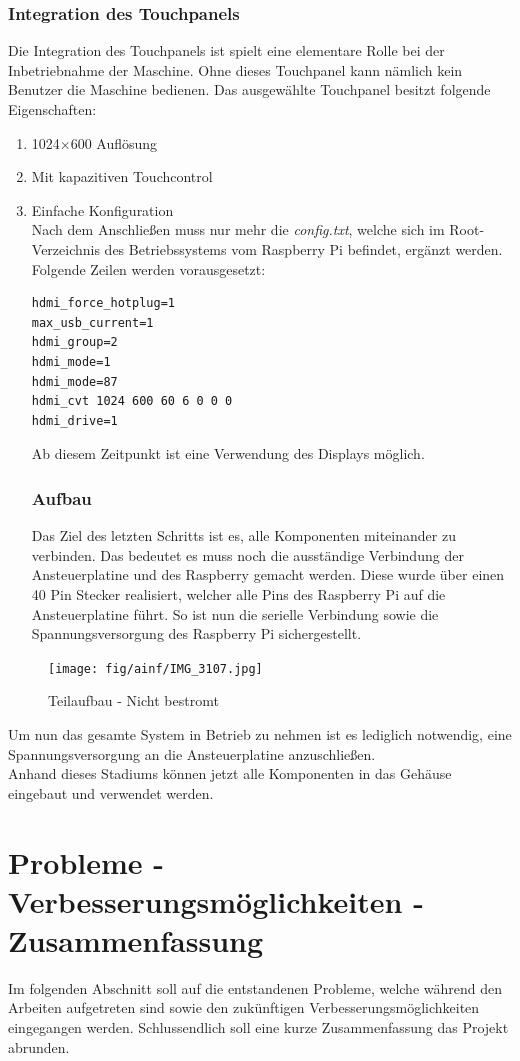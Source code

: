 \subsubsection{Integration des Touchpanels}
Die Integration des Touchpanels ist spielt eine elementare Rolle bei der Inbetriebnahme der Maschine.
Ohne dieses Touchpanel kann nämlich kein Benutzer die Maschine bedienen.
Das ausgewählte Touchpanel besitzt folgende Eigenschaften:
\begin{enumerate}
\item  1024×600 Auflösung
\item Mit kapazitiven Touchcontrol
\item Einfache Konfiguration\\
Nach dem Anschließen muss nur mehr die \textit{config.txt}, welche sich im Root-Verzeichnis des Betriebssystems vom Raspberry Pi befindet, ergänzt werden.
Folgende Zeilen werden vorausgesetzt:
\begin{lstlisting}[style=java,caption=Display-Parameter,label=resource]
hdmi_force_hotplug=1
max_usb_current=1
hdmi_group=2
hdmi_mode=1
hdmi_mode=87
hdmi_cvt 1024 600 60 6 0 0 0
hdmi_drive=1
\end{lstlisting}
Ab diesem Zeitpunkt ist eine Verwendung des Displays möglich.
\subsubsection{Aufbau}
Das Ziel des letzten Schritts ist es, alle Komponenten miteinander zu verbinden.
Das bedeutet es muss noch die ausständige Verbindung der Ansteuerplatine und des Raspberry gemacht werden.
Diese wurde über einen 40 Pin Stecker realisiert, welcher alle Pins des Raspberry Pi auf die Ansteuerplatine führt.
So ist nun die serielle Verbindung sowie die Spannungsversorgung des Raspberry Pi sichergestellt.
\end{enumerate}
\begin{figure}[H]
\centering
\texttt{[image: fig/ainf/IMG\_3107.jpg]}
\caption{Teilaufbau - Nicht bestromt}
\label{rpiAndDisplay}
\end{figure}
Um nun das gesamte System in Betrieb zu nehmen ist es lediglich notwendig, eine Spannungsversorgung an die Ansteuerplatine anzuschließen.\\
Anhand dieses Stadiums können jetzt alle Komponenten in das Gehäuse eingebaut und verwendet werden.
\newpage
\section{Probleme - Verbesserungsmöglichkeiten - Zusammenfassung}
Im folgenden Abschnitt soll auf die entstandenen Probleme, welche während den Arbeiten aufgetreten sind sowie den zukünftigen Verbesserungsmöglichkeiten eingegangen werden.
Schlussendlich soll eine kurze Zusammenfassung das Projekt abrunden.
